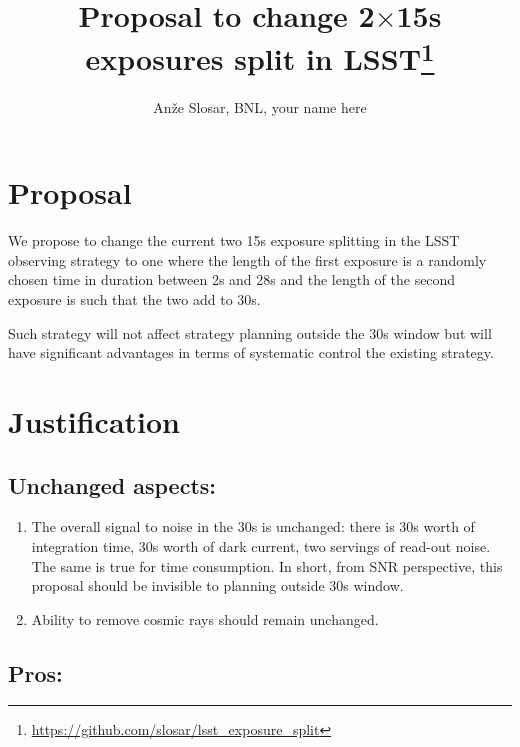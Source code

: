 \documentclass[12pt, a4paper]{article}
\begin{document}
\title{Proposal to change 2$\times$15s exposures split in LSST\thanks{\url{https://github.com/slosar/lsst_exposure_split}}}
\author{An\v{z}e Slosar, BNL, your name here}


\maketitle

\section*{Proposal}

We propose to change the current two 15s exposure splitting in the
LSST observing strategy to one where the length of the first exposure
is a randomly chosen time in duration between 2s and 28s and the
length of the second exposure is such that the two add to  30s.

Such strategy will not affect strategy planning outside the 30s window
but will have significant advantages in terms of systematic control
the existing strategy.

\section*{Justification}

\subsection*{Unchanged aspects:}
\begin{enumerate}

\item The overall signal to noise in the 30s is unchanged: there is
  30s worth of integration time, 30s worth of dark current, two servings
  of read-out noise. The same is true for time consumption. In short,
  from SNR perspective, this proposal should be invisible to planning
  outside 30s window.

\item Ability to remove cosmic rays should remain unchanged.
\end{enumerate}
\subsection*{Pros:}
\end{document}
